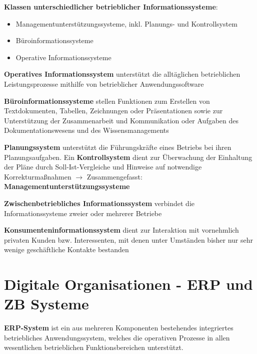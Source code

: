 \textbf{Klassen unterschiedlicher betrieblicher Informationssysteme}:
\begin{itemize}
	\item Managementunterstützungssysteme, inkl. Planungs- und Kontrollsystem
	\item Büroinformationssysteme
	\item Operative Informationssysteme 
\end{itemize}

\textbf{Operatives Informationssystem} unterstützt die alltäglichen betrieblichen Leistungsprozesse mithilfe von
betrieblicher Anwendungssoftware

\textbf{Büroinformationssysteme} stellen Funktionen zum Erstellen von Textdokumenten, Tabellen, Zeichnungen oder Präsentationen sowie zur Unterstützung der Zusammenarbeit und Kommunikation oder Aufgaben des Dokumentationswesens und des Wissensmanagements

\textbf{Planungssystem} unterstützt die Führungskräfte eines Betriebs bei ihren Planungsaufgaben. Ein \textbf{Kontrollsystem} dient zur Überwachung der Einhaltung der Pläne durch Soll-Ist-Vergleiche und Hinweise auf notwendige Korrekturmaßnahmen $\rightarrow$ Zusammengefasst: \textbf{Managementunterstützungssysteme}

\textbf{Zwischenbetriebliches Informationssystem} verbindet die Informationssysteme zweier oder mehrerer Betriebe

\textbf{Konsumenteninformationssystem} dient zur Interaktion mit vornehmlich privaten Kunden bzw.
Interessenten, mit denen unter Umständen bisher nur sehr wenige geschäftliche Kontakte bestanden

\section{Digitale Organisationen - ERP und ZB Systeme}
\textbf{ERP-System} ist ein aus mehreren Komponenten bestehendes integriertes betriebliches Anwendungssystem, welches die operativen Prozesse in allen wesentlichen betrieblichen Funktionsbereichen unterstützt.



